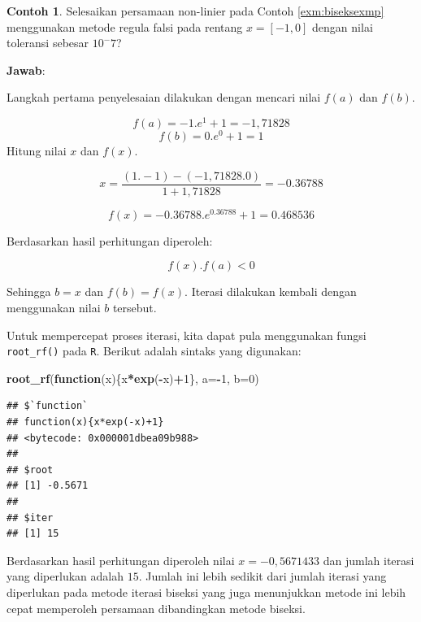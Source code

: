 \documentclass[
]{book}
\newenvironment{Shaded}{\begin{snugshade}}{\end{snugshade}}
\newcommand{\AttributeTok}[1]{\textcolor[rgb]{0.13,0.29,0.53}{#1}}
\newcommand{\ControlFlowTok}[1]{\textcolor[rgb]{0.13,0.29,0.53}{\textbf{#1}}}
\newcommand{\DecValTok}[1]{\textcolor[rgb]{0.00,0.00,0.81}{#1}}
\newcommand{\FunctionTok}[1]{\textcolor[rgb]{0.13,0.29,0.53}{\textbf{#1}}}
\newcommand{\NormalTok}[1]{#1}
\newcommand{\SpecialCharTok}[1]{\textcolor[rgb]{0.81,0.36,0.00}{\textbf{#1}}}
\theoremstyle{definition}
\theoremstyle{definition}
\newtheorem{example}{Contoh}[chapter]
\theoremstyle{definition}
\theoremstyle{definition}
\theoremstyle{remark}
\begin{document}
\begin{example}
\protect\hypertarget{exm:rfexmp}{}\label{exm:rfexmp}Selesaikan persamaan non-linier pada Contoh \ref{exm:biseksexmp} menggunakan metode regula falsi pada rentang \(x=\left[-1,0 \right]\) dengan nilai toleransi sebesar \(10^-7\)?
\end{example}

\textbf{Jawab}:

Langkah pertama penyelesaian dilakukan dengan mencari nilai \(f\left(a \right)\) dan \(f\left(b \right)\).

\[
f\left(a \right)=-1.e^{1}+1=-1,71828
\]
\[
f\left(b \right)=0.e^{0}+1=1
\]
Hitung nilai \(x\) dan \(f\left(x \right)\).

\[
x=\frac{\left(1.-1\right)-\left(-1,71828.0\right)}{1+1,71828}=-0.36788
\]

\[
f\left(x \right)=-0.36788.e^{0.36788}+1=0.468536
\]

Berdasarkan hasil perhitungan diperoleh:

\[
f\left(x \right).f\left(a \right)<0
\]

Sehingga \(b=x\) dan \(f\left(b \right)=f\left(x \right)\). Iterasi dilakukan kembali dengan menggunakan nilai \(b\) tersebut.

Untuk mempercepat proses iterasi, kita dapat pula menggunakan fungsi \texttt{root\_rf()} pada \texttt{R}. Berikut adalah sintaks yang digunakan:

\begin{Shaded}
\begin{Highlighting}[]
\FunctionTok{root\_rf}\NormalTok{(}\ControlFlowTok{function}\NormalTok{(x)\{x}\SpecialCharTok{*}\FunctionTok{exp}\NormalTok{(}\SpecialCharTok{{-}}\NormalTok{x)}\SpecialCharTok{+}\DecValTok{1}\NormalTok{\},}
               \AttributeTok{a=}\SpecialCharTok{{-}}\DecValTok{1}\NormalTok{, }\AttributeTok{b=}\DecValTok{0}\NormalTok{)}
\end{Highlighting}
\end{Shaded}

\begin{verbatim}
## $`function`
## function(x){x*exp(-x)+1}
## <bytecode: 0x000001dbea09b988>
## 
## $root
## [1] -0.5671
## 
## $iter
## [1] 15
\end{verbatim}

Berdasarkan hasil perhitungan diperoleh nilai \(x=-0,5671433\) dan jumlah iterasi yang diperlukan adalah \(15\). Jumlah ini lebih sedikit dari jumlah iterasi yang diperlukan pada metode iterasi biseksi yang juga menunjukkan metode ini lebih cepat memperoleh persamaan dibandingkan metode biseksi.
\end{document}
